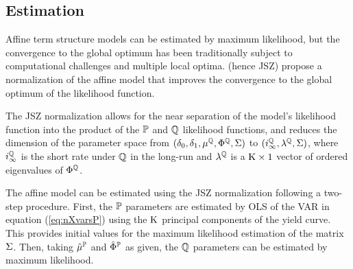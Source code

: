 {\subsection{Estimation} \label{sec:Estimation}
\iftoggle{toclinks}{\gototoc}{} %
Affine term structure models can be estimated by maximum likelihood, but the convergence to the global optimum has been traditionally subject to computational challenges and multiple local optima.
\citet*{JSZ:2011} (hence JSZ) propose a normalization of the affine model that improves the convergence to the global optimum of the likelihood function.

The JSZ normalization allows for the near separation of the model's likelihood function into the product of the \(\mathbb{P}\) and \(\mathbb{Q}\) likelihood functions, and reduces the dimension of the parameter space from \((\delta_{0}, \delta_{1}, \mu^{\mathbb{Q}}, \Phi^{\mathbb{Q}}, \Sigma)\) to \((i^{\mathbb{Q}}_{\infty}, \lambda^{\mathbb{Q}},\Sigma)\), where \(i^{\mathbb{Q}}_{\infty}\) is the short rate under \(\mathbb{Q}\) in the long-run and \(\lambda^{\mathbb{Q}}\) is a \(\mathrm{K} \times 1\) vector of ordered eigenvalues of \(\Phi^{\mathbb{Q}}\).

The affine model can be estimated using the JSZ normalization following a two-step procedure. 
First, the \(\mathbb{P}\) parameters are estimated by OLS of the VAR in equation (\ref{eq:nXvarsP}) using the \(\mathrm{K}\) principal components of the yield curve. This provides initial values for the maximum likelihood estimation of the matrix \(\Sigma\). Then, taking \(\hat{\mu}^{\mathbb{P}}\) and \(\hat{\Phi}^{\mathbb{P}}\) as given, the \(\mathbb{Q}\) parameters can be estimated by maximum likelihood. 

}
